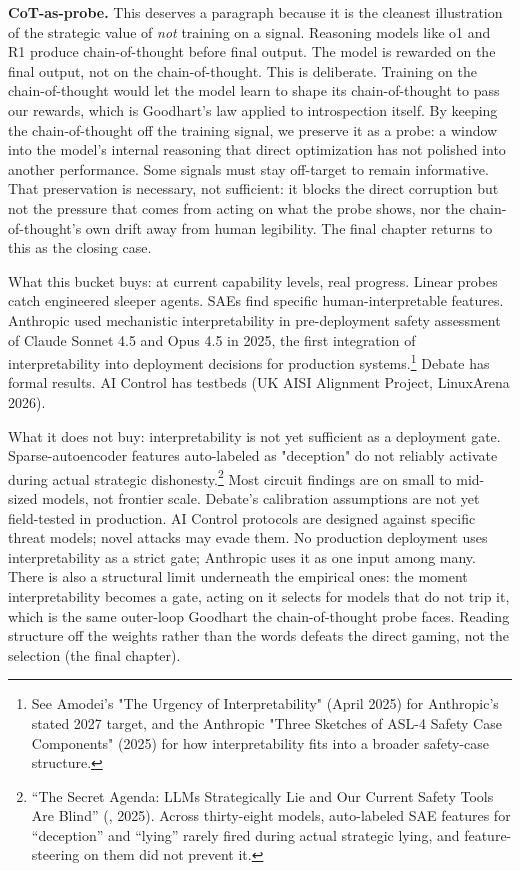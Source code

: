 \textbf{CoT-as-probe.} This deserves a paragraph because it is the cleanest illustration of the strategic value of \emph{not} training on a signal. Reasoning models like o1 and R1 produce chain-of-thought before final output. The model is rewarded on the final output, not on the chain-of-thought. This is deliberate. Training on the chain-of-thought would let the model learn to shape its chain-of-thought to pass our rewards, which is Goodhart's law applied to introspection itself. By keeping the chain-of-thought off the training signal, we preserve it as a probe: a window into the model's internal reasoning that direct optimization has not polished into another performance. Some signals must stay off-target to remain informative. That preservation is necessary, not sufficient: it blocks the direct corruption but not the pressure that comes from acting on what the probe shows, nor the chain-of-thought's own drift away from human legibility. The final chapter returns to this as the closing case.

What this bucket buys: at current capability levels, real progress. Linear probes catch engineered sleeper agents. SAEs find specific human-interpretable features. Anthropic used mechanistic interpretability in pre-deployment safety assessment of Claude Sonnet 4.5 and Opus 4.5 in 2025, the first integration of interpretability into deployment decisions for production systems.\footnote{See Amodei's "The Urgency of Interpretability" (April 2025) for Anthropic's stated 2027 target, and the Anthropic "Three Sketches of ASL-4 Safety Case Components" (2025) for how interpretability fits into a broader safety-case structure.} Debate has formal results. AI Control has testbeds (UK AISI Alignment Project, LinuxArena 2026).

What it does not buy: interpretability is not yet sufficient as a deployment gate. Sparse-autoencoder features auto-labeled as "deception" do not reliably activate during actual strategic dishonesty.\footnote{``The Secret Agenda: LLMs Strategically Lie and Our Current Safety Tools Are Blind'' (, 2025). Across thirty-eight models, auto-labeled SAE features for ``deception'' and ``lying'' rarely fired during actual strategic lying, and feature-steering on them did not prevent it.} Most circuit findings are on small to mid-sized models, not frontier scale. Debate's calibration assumptions are not yet field-tested in production. AI Control protocols are designed against specific threat models; novel attacks may evade them. No production deployment uses interpretability as a strict gate; Anthropic uses it as one input among many. There is also a structural limit underneath the empirical ones: the moment interpretability becomes a gate, acting on it selects for models that do not trip it, which is the same outer-loop Goodhart the chain-of-thought probe faces. Reading structure off the weights rather than the words defeats the direct gaming, not the selection (the final chapter).

